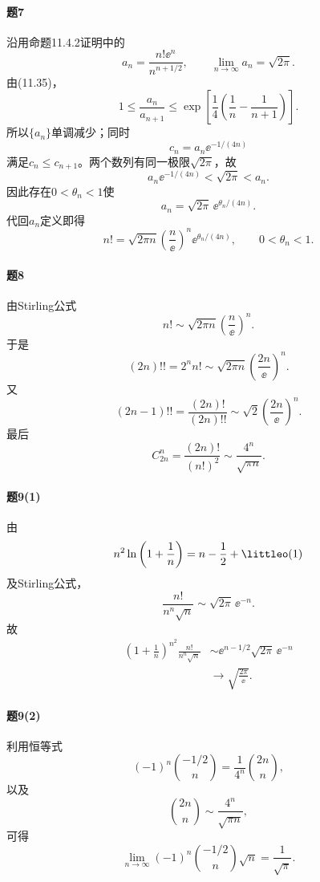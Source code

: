 \paragraph{题7}
\begin{xsolution}
沿用命题11.4.2证明中的
\[
 a_n=\frac{n!\ee^n}{n^{n+1/2}},
 \qquad \lim_{n\to\infty}a_n=\sqrt{2\pi}.
\]
由(11.35)，
\[
 1\le\frac{a_n}{a_{n+1}}
 \le\exp\left[\frac14\left(\frac1n-\frac1{n+1}\right)\right].
\]
所以$\{a_n\}$单调减少；同时
\[
 c_n=a_n\ee^{-1/(4n)}
\]
满足$c_n\le c_{n+1}$。两个数列有同一极限$\sqrt{2\pi}$，故
\[
 a_n\ee^{-1/(4n)}<\sqrt{2\pi}<a_n.
\]
因此存在$0<\theta_n<1$使
\[
 a_n=\sqrt{2\pi}\,\ee^{\theta_n/(4n)}.
\]
代回$a_n$定义即得
\[
 \boxed{
 n!=\sqrt{2\pi n}\left(\frac n\ee\right)^n
 \ee^{\theta_n/(4n)},\qquad 0<\theta_n<1}.
\]
\end{xsolution}

\paragraph{题8}
\begin{xsolution}
由Stirling公式
\[
 n!\sim\sqrt{2\pi n}\left(\frac n\ee\right)^n.
\]
于是
\[
 (2n)!!=2^nn!
 \sim\boxed{\sqrt{2\pi n}\left(\frac{2n}{\ee}\right)^n}.
\]
又
\[
 (2n-1)!!=\frac{(2n)!}{(2n)!!}
 \sim\boxed{\sqrt2\left(\frac{2n}{\ee}\right)^n}.
\]
最后
\[
 C_{2n}^n=\frac{(2n)!}{(n!)^2}
 \sim\boxed{\frac{4^n}{\sqrt{\pi n}}}.
\]
\end{xsolution}

\paragraph{题9(1)}
\begin{xsolution}
由
\[
 n^2\ln\left(1+\frac1n\right)
 =n-\frac12+\littleo(1)
\]
及Stirling公式，
\[
 \frac{n!}{n^n\sqrt n}
 \sim\sqrt{2\pi}\,\ee^{-n}.
\]
故
\begin{align*}
\left(1+\frac1n\right)^{n^2}\frac{n!}{n^n\sqrt n}
&\sim \ee^{n-1/2}\sqrt{2\pi}\,\ee^{-n}\\
&\longrightarrow\boxed{\sqrt{\frac{2\pi}{\ee}}}.
\end{align*}
\end{xsolution}

\paragraph{题9(2)}
\begin{xsolution}
利用恒等式
\[
 (-1)^n\binom{-1/2}{n}=\frac1{4^n}\binom{2n}{n},
\]
以及
\[
 \binom{2n}{n}\sim\frac{4^n}{\sqrt{\pi n}},
\]
可得
\[
 \boxed{\lim_{n\to\infty}(-1)^n\binom{-1/2}{n}\sqrt n
 =\frac1{\sqrt\pi}}.
\]
\end{xsolution}

